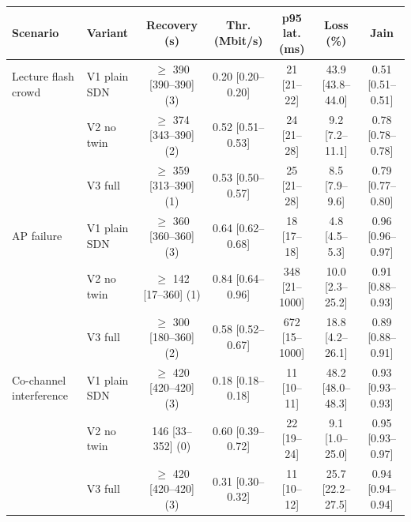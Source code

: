 \begin{tabular}{@{}llccccc@{}}
\toprule
Scenario & Variant & Recovery (s) & Thr. (Mbit/s) & p95 lat. (ms) & Loss (\%) & Jain \\
\midrule
Lecture flash crowd & V1 plain SDN & $\geq$ 390 [390--390] (3) & 0.20 [0.20--0.20] & 21 [21--22] & 43.9 [43.8--44.0] & 0.51 [0.51--0.51] \\
 & V2 no twin & $\geq$ 374 [343--390] (2) & 0.52 [0.51--0.53] & 24 [21--28] & 9.2 [7.2--11.1] & 0.78 [0.78--0.78] \\
 & V3 full & $\geq$ 359 [313--390] (1) & 0.53 [0.50--0.57] & 25 [21--28] & 8.5 [7.9--9.6] & 0.79 [0.77--0.80] \\
\addlinespace
AP failure & V1 plain SDN & $\geq$ 360 [360--360] (3) & 0.64 [0.62--0.68] & 18 [17--18] & 4.8 [4.5--5.3] & 0.96 [0.96--0.97] \\
 & V2 no twin & $\geq$ 142 [17--360] (1) & 0.84 [0.64--0.96] & 348 [21--1000] & 10.0 [2.3--25.2] & 0.91 [0.88--0.93] \\
 & V3 full & $\geq$ 300 [180--360] (2) & 0.58 [0.52--0.67] & 672 [15--1000] & 18.8 [4.2--26.1] & 0.89 [0.88--0.91] \\
\addlinespace
Co-channel interference & V1 plain SDN & $\geq$ 420 [420--420] (3) & 0.18 [0.18--0.18] & 11 [10--11] & 48.2 [48.0--48.3] & 0.93 [0.93--0.93] \\
 & V2 no twin & 146 [33--352] (0) & 0.60 [0.39--0.72] & 22 [19--24] & 9.1 [1.0--25.0] & 0.95 [0.93--0.97] \\
 & V3 full & $\geq$ 420 [420--420] (3) & 0.31 [0.30--0.32] & 11 [10--12] & 25.7 [22.2--27.5] & 0.94 [0.94--0.94] \\
\bottomrule
\end{tabular}

